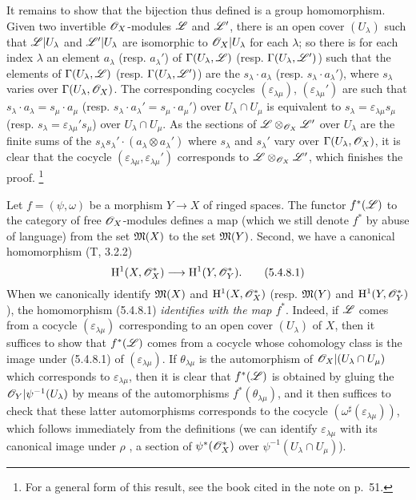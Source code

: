\begin{env}[5.4.7]
It remains to show that
the bijection thus defined is a group homomorphism.
Given two invertible $\mathscr{O}_X$-modules $\mathscr{L}$ and $\mathscr{L}'$, there is an open cover $(U_\lambda)$ such that $\mathscr{L}|U_\lambda$ and $\mathscr{L}'|U_\lambda$ are isomorphic to $\mathscr{O}_X|U_\lambda$ for each $\lambda$;
so there is for each index $\lambda$ an element $a_\lambda$ (resp. $a_\lambda'$) of $\Gamma(U_\lambda,\mathscr{L})$ (resp. $\Gamma(U_\lambda,\mathscr{L}')$) such that the elements of $\Gamma(U_\lambda,\mathscr{L})$ (resp. $\Gamma(U_\lambda,\mathscr{L}')$) are the $s_\lambda\cdot a_\lambda$ (resp. $s_\lambda\cdot a_\lambda'$), where $s_\lambda$ varies over $\Gamma(U_\lambda,\mathscr{O}_X)$.
The corresponding cocycles $(\varepsilon_{\lambda\mu})$, $(\varepsilon_{\lambda\mu}')$ are such that $s_\lambda\cdot a_\lambda=s_\mu\cdot a_\mu$ (resp. $s_\lambda\cdot a_\lambda'=s_\mu\cdot a_\mu'$) over $U_\lambda\cap U_\mu$ is equivalent to $s_\lambda=\varepsilon_{\lambda\mu}s_\mu$ (resp. $s_\lambda=\varepsilon_{\lambda\mu}' s_\mu$) over $U_\lambda\cap U_\mu$.
As the sections of $\mathscr{L}\otimes_{\mathscr{O}_X}\mathscr{L}'$ over $U_\lambda$ are the finite sums of the $s_\lambda s_\lambda'\cdot(a_\lambda\otimes a_\lambda')$ where $s_\lambda$ and $s_\lambda'$ vary over $\Gamma(U_\lambda,\mathscr{O}_X)$, it is clear that the cocycle $(\varepsilon_{\lambda\mu},\varepsilon_{\lambda\mu}')$ corresponds to $\mathscr{L}\otimes_{\mathscr{O}_X}\mathscr{L}'$, which finishes the proof.
\footnote{For a general form of this result, see the book cited in the note on p.~51.}
\end{env}

\begin{env}[5.4.8]
\label{0.5.4.8}
Let $f=(\psi,\omega)$ be a morphism $Y\to X$ of ringed spaces.
The functor $f^*(\mathscr{L})$ to the category of free $\mathscr{O}_X$-modules defines a map (which we still denote $f^*$ by abuse of language) from the set $\mathfrak{M}(X)$ to the set $\mathfrak{M}(Y)$.
Second, we have a canonical homomorphism (T, 3.2.2)
\[
  \HH^1(X,\OO_X^*)\to\HH^1(Y,\OO_Y^*).
  \tag{5.4.8.1}
\]
When we canonically identify  $\mathfrak{M}(X)$ and $\mathrm{H}^1(X,\mathscr{O}_X^*)$ (resp. $\mathfrak{M}(Y)$ and $\mathrm{H}^1(Y,\mathscr{O}_Y^*)$), the homomorphism (5.4.8.1) \emph{identifies with the map $f^*$}.
Indeed, if $\mathscr{L}$ comes from a cocycle $(\varepsilon_{\lambda\mu})$ corresponding to an open cover $(U_\lambda)$ of $X$, then it suffices to show that $f^*(\mathscr{L})$ comes from a cocycle whose cohomology class is the image under (5.4.8.1) of $(\varepsilon_{\lambda\mu})$.
If $\theta_{\lambda\mu}$ is the automorphism of $\mathscr{O}_X|(U_\lambda\cap U_\mu)$ which corresponds to $\varepsilon_{\lambda\mu}$, then it is clear that $f^*(\mathscr{L})$ is obtained by gluing the $\mathscr{O}_Y|\psi^{-1}(U_\lambda)$ by means of the automorphisms $f^*(\theta_{\lambda\mu})$, and it then suffices to check that these latter automorphisms corresponds to the cocycle $(\omega^\sharp(\varepsilon_{\lambda\mu}))$, which follows immediately from the definitions (we can identify $\varepsilon_{\lambda\mu}$ with its canonical image under $\rho$ , a section of $\psi^*(\mathscr{O}_X^*)$ over $\psi^{-1}(U_\lambda\cap U_\mu)$).
\end{env}

